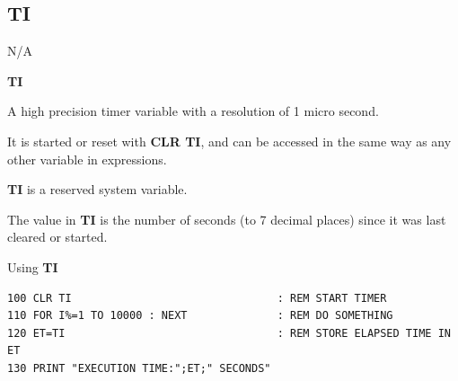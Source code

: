 
\newpage
\subsection{TI}
\begin{description}[leftmargin=2cm,style=nextline]
\item [Token:]    N/A

\item [Format:]   {\bf TI}

\item [Usage:]    A high precision timer variable with a resolution of 1 micro second.

                  It is started or reset with {\bf CLR TI}, and can be accessed in the same way as any other variable in expressions.

\item [Remarks:]  {\bf TI} is a reserved system variable.

                  The value in {\bf TI} is the number of seconds (to 7 decimal places) since it was last cleared or started.

\item [Example:]  Using {\bf TI}

\begin{tcolorbox}[colback=black,coltext=white]
\verbatimfont{\codefont}
\begin{verbatim}
100 CLR TI                                : REM START TIMER
110 FOR I%=1 TO 10000 : NEXT              : REM DO SOMETHING
120 ET=TI                                 : REM STORE ELAPSED TIME IN ET
130 PRINT "EXECUTION TIME:";ET;" SECONDS"
\end{verbatim}
\end{tcolorbox}
\end{description}


\newpage
